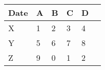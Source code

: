 \begin{tabular}{lx{15mm}x{15mm}x{15mm}x{15mm}x{15mm}}
\midrule
Date &  A &  B &  C &  D \tabularnewline
\midrule
   X &  1 &  2 &  3 &  4 \tabularnewline
   Y &  5 &  6 &  7 &  8 \tabularnewline
   Z &  9 &  0 &  1 &  2 \tabularnewline
\midrule
\end{tabular}
